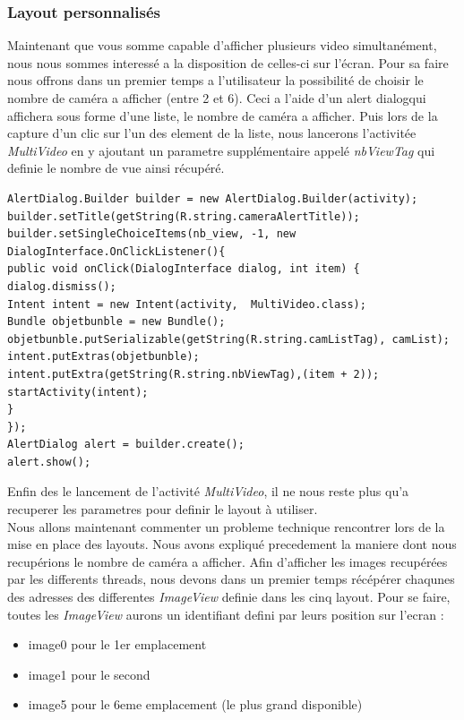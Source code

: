 \subsubsection{Layout personnalisés}
Maintenant que vous somme capable d'afficher plusieurs video simultanément,
nous nous sommes interessé a la disposition de celles-ci sur l'écran.
Pour sa faire nous offrons dans un premier temps a l'utilisateur la possibilité
de choisir le nombre de caméra a afficher (entre 2 et 6).\newline
Ceci a l'aide d'un alert dialogqui affichera sous forme d'une liste, le nombre
de caméra a afficher. Puis lors de la capture d'un clic sur l'un des element de
la liste, nous lancerons l'activitée \textit{MultiVideo} en y ajoutant un
parametre supplémentaire appelé \textit{nbViewTag} qui definie le nombre de vue
ainsi récupéré.
\begin{changemargin}{0cm}{0cm}
\begin{lstlisting}[caption={Multi-Video launcher}] 
AlertDialog.Builder builder = new AlertDialog.Builder(activity);
builder.setTitle(getString(R.string.cameraAlertTitle));
builder.setSingleChoiceItems(nb_view, -1, new DialogInterface.OnClickListener(){ 
public void onClick(DialogInterface dialog, int item) {
dialog.dismiss();
Intent intent = new Intent(activity,  MultiVideo.class);
Bundle objetbunble = new Bundle();
objetbunble.putSerializable(getString(R.string.camListTag), camList);
intent.putExtras(objetbunble);
intent.putExtra(getString(R.string.nbViewTag),(item + 2));
startActivity(intent);
}
});
AlertDialog alert = builder.create();
alert.show();
\end{lstlisting}    
\end{changemargin}
Enfin des le lancement de l'activité \textit{MultiVideo}, il ne nous reste plus
qu'a recuperer les parametres pour definir le layout à utiliser.\\
\newline\indent Nous allons maintenant commenter un probleme technique
rencontrer lors de la mise en place des layouts.
Nous avons expliqué precedement la maniere dont nous recupérions le nombre de
caméra a afficher. Afin d'afficher les images recupérées par les differents
threads, nous devons dans un premier temps récépérer chaqunes des adresses des
differentes \textit{ImageView} definie dans les cinq layout. \newline Pour se
faire, toutes les \textit{ImageView} aurons un identifiant defini par leurs
position sur l'ecran :
\begin{itemize}
\item image0 pour le 1er emplacement
\item image1 pour le second
\item image5 pour le 6eme emplacement (le plus grand disponible)
\end{itemize}
